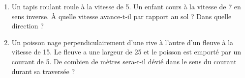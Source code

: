 
\begin{exercice}\label{exosmath-0111}

    \begin{enumerate}
        \item
            Un tapis roulant roule à la vitesse de \unit{5}{\kilo\meter\per\hour}. Un enfant cours à la vitesse de \unit{7}{\kilo\meter\per\hour} en sens inverse. À quelle vitesse avance-t-il par rapport au sol ? Dans quelle direction ?
        \item
            Un poisson nage perpendiculairement d'une rive à l'autre d'un fleuve à la vitesse de \unit{15}{\kilo\meter\per\hour}. Le fleuve a une largeur de \unit{25}{\meter} et le poisson est emporté par un courant de \unit{5}{\kilo\meter\per\hour}. De combien de mètres sera-t-il dévié dans le sens du courant durant sa traversée ?
    \end{enumerate}

\end{exercice}
